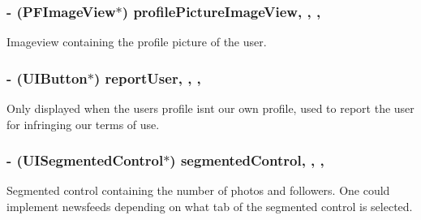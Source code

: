 \subsubsection[{profile\+Picture\+Image\+View}]{\setlength{\rightskip}{0pt plus 5cm}-\/ (P\+F\+Image\+View$\ast$) profile\+Picture\+Image\+View\hspace{0.3cm}{\ttfamily [read]}, {\ttfamily [write]}, {\ttfamily [nonatomic]}, {\ttfamily [strong]}}\label{interface_e_s_account_view_controller_ab114efbbc510453ce53da7d275ec3c39}
Imageview containing the profile picture of the user. \hypertarget{interface_e_s_account_view_controller_a5971ba7c56ad078da3e095e88793ddd3}{}
\subsubsection[{report\+User}]{\setlength{\rightskip}{0pt plus 5cm}-\/ (U\+I\+Button$\ast$) report\+User\hspace{0.3cm}{\ttfamily [read]}, {\ttfamily [write]}, {\ttfamily [nonatomic]}, {\ttfamily [strong]}}\label{interface_e_s_account_view_controller_a5971ba7c56ad078da3e095e88793ddd3}
Only displayed when the user\textquotesingle{}s profile isn\textquotesingle{}t our own profile, used to report the user for infringing our terms of use. \hypertarget{interface_e_s_account_view_controller_a93631de00857b801a70eccaf514258ba}{}
\subsubsection[{segmented\+Control}]{\setlength{\rightskip}{0pt plus 5cm}-\/ (U\+I\+Segmented\+Control$\ast$) segmented\+Control\hspace{0.3cm}{\ttfamily [read]}, {\ttfamily [write]}, {\ttfamily [nonatomic]}, {\ttfamily [strong]}}\label{interface_e_s_account_view_controller_a93631de00857b801a70eccaf514258ba}
Segmented control containing the number of photos and followers. One could implement newsfeeds depending on what tab of the segmented control is selected. \hypertarget{interface_e_s_account_view_controller_a247434b91575e36283b4896ca255f4fd}{}
